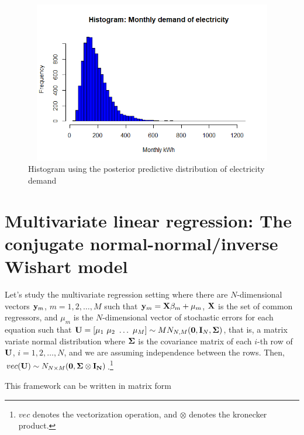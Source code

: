 \begin{figure}[!h]
	\includegraphics[width=340pt, height=200pt]{Chapters/chapter4/figures/PredDemElect.png}
	\caption[List of figure caption goes here]{Histogram using the posterior predictive distribution of electricity demand}\label{fig41}
\end{figure}

 
\section{Multivariate linear regression: The conjugate normal-normal/inverse Wishart model}\label{sec44}

Let's study the multivariate regression setting where there are $N$-dimensional vectors ${\bf{y}}_m$, $m=1,2,\dots,M$ such that ${\bf{y}}_m={\bf{X}}\beta_m+\mu_m$, ${\bf{X}}$ is the set of common regressors, and $\mu_m$ is the $N$-dimensional vector of stochastic errors for each equation such that ${\bf{U}}=[\mu_1 \ \mu_2 \ \dots \ \mu_M]\sim MN_{N,M}({\bf{0}}, {\bf{I}}_N, {\bf\Sigma})$, that is, a matrix variate normal distribution where $\bf\Sigma$ is the covariance matrix of each $i$-th row of ${\bf{U}}$, $i=1,2,\dots,N$, and we are assuming independence between the rows. Then, $vec({\bf U})\sim N_{N\times M}({\bf 0}, \bf{\Sigma}\otimes {\bf{I}}_N)$.\footnote{$vec$ denotes the vectorization operation, and $\otimes$ denotes the kronecker product.}

This framework can be written in matrix form


